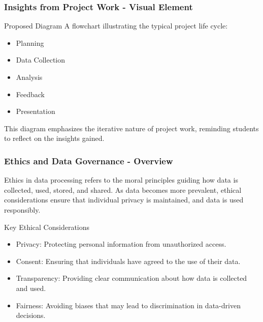 \documentclass[aspectratio=169]{beamer}
\begin{document}
\begin{frame}[fragile]
    \frametitle{Insights from Project Work - Visual Element}
    \begin{block}{Proposed Diagram}
        A flowchart illustrating the typical project life cycle:
        \begin{itemize}
            \item Planning
            \item Data Collection
            \item Analysis
            \item Feedback
            \item Presentation
        \end{itemize}
        \pause
        This diagram emphasizes the iterative nature of project work, reminding students to reflect on the insights gained.
    \end{block}
\end{frame}

\begin{frame}[fragile]
    \frametitle{Ethics and Data Governance - Overview}
    Ethics in data processing refers to the moral principles guiding how data is collected, used, stored, and shared. As data becomes more prevalent, ethical considerations ensure that individual privacy is maintained, and data is used responsibly. 

    \begin{block}{Key Ethical Considerations}
        \begin{itemize}
            \item Privacy: Protecting personal information from unauthorized access.
            \item Consent: Ensuring that individuals have agreed to the use of their data.
            \item Transparency: Providing clear communication about how data is collected and used.
            \item Fairness: Avoiding biases that may lead to discrimination in data-driven decisions.
        \end{itemize}
    \end{block}
\end{frame}
\end{document}
